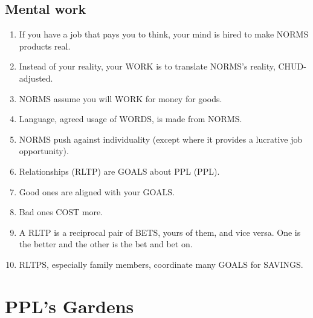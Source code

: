 \documentclass[
]{book}
\begin{document}
\hypertarget{mental-work}{%
\subsection{Mental work}\label{mental-work}}

\begin{enumerate}
\def\labelenumi{\arabic{enumi}.}
\setcounter{enumi}{13}
\item
  If you have a job that pays you to think, your mind is hired to make NORMS products real.
\item
  Instead of your reality, your WORK is to translate NORMS's reality, CHUD-adjusted.
\item
  NORMS assume you will WORK for money for goods.
\item
  Language, agreed usage of WORDS, is made from NORMS.
\item
  NORMS push against individuality (except where it provides a lucrative job opportunity).
\item
  Relationships (RLTP) are GOALS about PPL (PPL).
\item
  Good ones are aligned with your GOALS.
\item
  Bad ones COST more.
\item
  A RLTP is a reciprocal pair of BETS, yours of them, and vice versa. One is the better and the other is the bet and bet on.
\item
  RLTPS, especially family members, coordinate many GOALS for SAVINGS.
\end{enumerate}

\hypertarget{ppls-gardens}{%
\section{PPL's Gardens}\label{ppls-gardens}}
\end{document}

